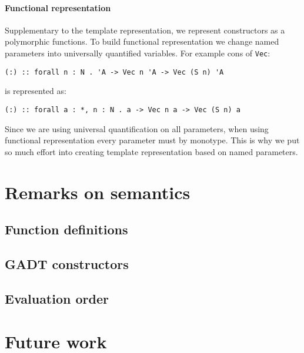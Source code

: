 \documentclass[declaration,shortabstract,english]{iithesis}
\begin{document}
\subsubsection*{Functional representation}
Supplementary to the template representation, we represent constructors as a polymorphic functions.
To build functional representation we change named parameters into universally quantified variables.
For example cons of \verb+Vec+:
\begin{verbatim}
(:) :: forall n : N . 'A -> Vec n 'A -> Vec (S n) 'A
\end{verbatim}
is represented as:
\begin{verbatim}
(:) :: forall a : *, n : N . a -> Vec n a -> Vec (S n) a
\end{verbatim}
Since we are using universal quantification on all parameters,
when using functional representation every parameter must by monotype.
This is why we put so much effort into creating template representation based on named
parameters.

\chapter{Remarks on semantics}
\section{Function definitions}
\section{GADT constructors}
\section{Evaluation order}

\chapter{Future work}




\end{document}
